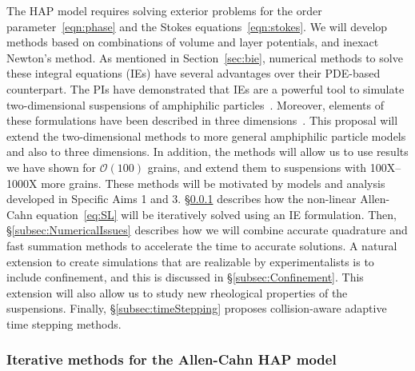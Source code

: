 The HAP model requires solving exterior problems for the order
parameter~\eqref{eqn:phase} and the Stokes equations~\eqref{eqn:stokes}.
We will develop methods based on combinations of volume and layer
potentials, and inexact Newton's method. As mentioned in
Section~\ref{sec:bie}, numerical methods to solve these integral
equations (IEs) have several advantages over their PDE-based
counterpart. The PIs have demonstrated that IEs are a powerful tool to
simulate two-dimensional suspensions of amphiphilic
particles~\cite{Fu2018_SIAM, FuQuRyYo20, fu-ryh-qua-you2022}. Moreover,
elements of these formulations have been described in three
dimensions~\cite{ying_2006, manasthesis, rac-gre2016}. This proposal
will extend the two-dimensional methods to more general amphiphilic
particle models and also to three dimensions. In addition, the methods
will allow us to use results we have shown for $\mathcal{O}(100)$
grains, and extend them to suspensions with 100X--1000X more grains.
These methods will be motivated by models and analysis developed in
Specific Aims 1 and 3. \S\ref{subsec:AC} describes how the non-linear
Allen-Cahn equation~\eqref{eq:SL} will be iteratively solved using an IE
formulation. Then, \S\ref{subsec:NumericalIssues} describes how we will
combine accurate quadrature and fast summation methods to accelerate the
time to accurate solutions. A natural extension to create simulations
that are realizable by experimentalists is to include confinement, and
this is discussed in \S\ref{subsec:Confinement}. This extension will
also allow us to study new rheological properties of the suspensions.
Finally, \S\ref{subsec:timeStepping} proposes collision-aware adaptive
time stepping methods.

\subsubsection{Iterative methods for the Allen-Cahn HAP model}
\label{subsec:AC}

